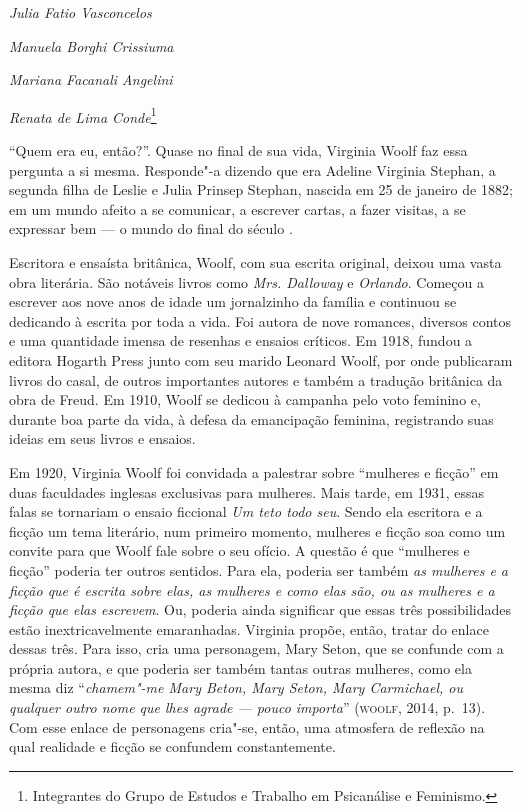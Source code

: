 \begin{flushright}
\emph{Julia Fatio Vasconcelos}

\emph{Manuela Borghi Crissiuma}

\emph{Mariana Facanali Angelini}

\emph{Renata de Lima Conde}\footnote{Integrantes do Grupo de Estudos e
  Trabalho em Psicanálise e Feminismo.}
\end{flushright}

``Quem era eu, então?''. Quase no final de sua vida, Virginia Woolf faz
essa pergunta a si mesma. Responde"-a dizendo que era Adeline Virginia
Stephan, a segunda filha de Leslie e Julia Prinsep Stephan, nascida em
25 de janeiro de 1882; em um mundo afeito a se comunicar, a escrever
cartas, a fazer visitas, a se expressar bem --- o mundo do final do século
.

Escritora e ensaísta britânica, Woolf, com sua escrita original, deixou
uma vasta obra literária. São notáveis livros como \emph{Mrs.
Dalloway} e \emph{Orlando}. Começou a escrever aos nove anos de idade um
jornalzinho da família e continuou se dedicando à escrita por toda a
vida. Foi autora de nove romances, diversos contos e uma quantidade
imensa de resenhas e ensaios críticos. Em 1918, fundou a editora Hogarth
Press junto com seu marido Leonard Woolf, por onde publicaram livros do
casal, de outros importantes autores e também a tradução britânica da
obra de Freud. Em 1910, Woolf se dedicou à campanha pelo voto feminino
e, durante boa parte da vida, à defesa da emancipação feminina,
registrando suas ideias em seus livros e ensaios.

Em 1920, Virginia Woolf foi convidada a palestrar sobre ``mulheres e
ficção'' em duas faculdades inglesas exclusivas para mulheres. Mais
tarde, em 1931, essas falas se tornariam o ensaio ficcional \emph{Um
teto todo seu}. Sendo ela escritora e a ficção um tema literário, num
primeiro momento, mulheres e ficção soa como um convite para que Woolf
fale sobre o seu ofício. A questão é que ``mulheres e ficção'' poderia
ter outros sentidos. Para ela, poderia ser também \emph{as
mulheres e a ficção que é escrita sobre elas, as mulheres e como elas
são, ou as mulheres e a ficção que elas escrevem}. Ou, poderia ainda
significar que essas três possibilidades estão inextricavelmente
emaranhadas. Virginia propõe, então, tratar do enlace dessas três. Para
isso, cria uma personagem, Mary Seton, que se confunde com a própria
autora, e que poderia ser também tantas outras mulheres, como ela mesma
diz ``\emph{chamem"-me Mary Beton, Mary Seton, Mary Carmichael, ou
qualquer outro nome que lhes agrade --- pouco importa}'' (\textsc{woolf}, 2014,
p.~13). Com esse enlace de personagens cria"-se, então, uma atmosfera de
reflexão na qual realidade e ficção se confundem constantemente.

